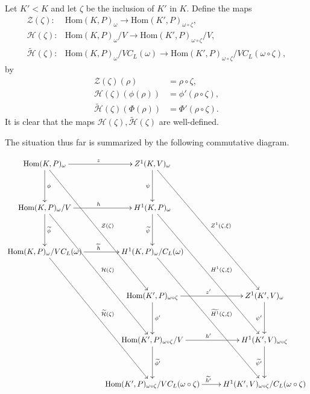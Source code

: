 \begin{definition} \label{main_cd} Let $K' < K$ and let $\zeta$ be the inclusion of $K'$ in $K$. Define the maps
	\begin{align*}
		\mathcal{Z}(\zeta):&\mathrm{Hom}(K, P)_\omega \rightarrow \mathrm{Hom}(K', P)_{\omega\circ\zeta}, \\
		\mathcal{H}(\zeta):&\mathrm{Hom}(K, P)_\omega/V \rightarrow \mathrm{Hom}(K', P)_{\omega\circ\zeta}/V, \\
		\widetilde{\mathcal{H}}(\zeta):&\mathrm{Hom}(K, P)_\omega/VC_L(\omega) \rightarrow \mathrm{Hom}(K', P)_{\omega\circ\zeta}/VC_L(\omega\circ\zeta),
	\end{align*}
	by
	\begin{align*}
		\mathcal{Z}(\zeta)(\rho) &= \rho\circ\zeta, \\
		\mathcal{H}(\zeta)(\phi(\rho)) &= \phi'(\rho\circ\zeta), \\
		\widetilde{\mathcal{H}}(\zeta)(\Phi(\rho)) &= \Phi'(\rho\circ\zeta).
	\end{align*}
It is clear that the maps $\mathcal{H}(\zeta), \widetilde{\mathcal{H}}(\zeta)$ are well-defined.

The situation thus far is summarized by the following commutative diagram.
\par\nobreak
	{\small
	\setlength{\abovedisplayskip}{6pt}
	\setlength{\belowdisplayskip}{\abovedisplayskip}
	\setlength{\abovedisplayshortskip}{3pt}
	\setlength{\belowdisplayshortskip}{3pt}
	\begin{align*}
		\xymatrix@R=40pt{
			\mathrm{Hom}(K, P)_\omega \ar[r]^{z} \ar[d]^{\phi} \ar[dddr]^{\mathcal{Z}(\zeta)} & Z^1(K, V)_\omega \ar[d]_{\psi} \ar[dddr]^{Z^1(\zeta, \xi)} & \\
			\mathrm{Hom}(K, P)_\omega/V \ar[r]^{h} \ar[d]^{\widetilde{\phi}} \ar[dddr]^{\mathcal{H}(\zeta)} & H^1(K, P)_\omega \ar[d]_{\widetilde{\psi}} \ar[dddr]^{H^1(\zeta, \xi)} & \\
			\mathrm{Hom}(K, P)_\omega/VC_L(\omega) \ar[r]^{\widetilde{h}} \ar[dddr]^{\widetilde{\mathcal{H}}(\zeta)} & H^1(K, P)_\omega/C_L(\omega) \ar[dddr]^{\widetilde{H^1}(\zeta, \xi)} & \\
			& \mathrm{Hom}(K', P)_{\omega\circ\zeta} \ar[r]^{z'} \ar[d]^{\phi'} & Z^1(K', V)_\omega \ar[d]_{\psi'} \\
			& \mathrm{Hom}(K', P)_{\omega\circ\zeta}/V \ar[r]^{h'} \ar[d]^{\widetilde{\phi'}} & H^1(K', V)_{\omega\circ\zeta} \ar[d]_{\widetilde{\psi'}} \\
			& \mathrm{Hom}(K', P)_{\omega\circ\zeta}/VC_L(\omega\circ\zeta) \ar[r]^{\widetilde{h'}} & H^1(K', V)_{\omega\circ\zeta}/C_L(\omega\circ\zeta) \\
		}
	\end{align*}
	}%
\end{definition}

